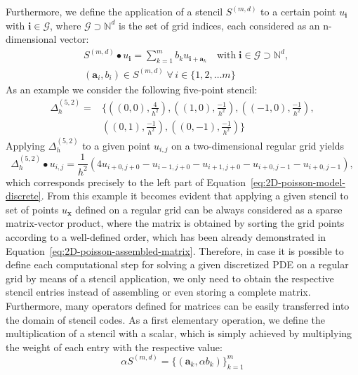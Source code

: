 Furthermore, we define the application of a stencil $S^{(m, d)}$ to a certain point $u_{\bm i}$ with $\bm i \in \mathcal G$, where $\mathcal G \supset \mathbb{N}^d$ is the set of grid indices, each considered as an n-dimensional vector:
\begin{equation}
	\begin{split}
		& S^{(m, d)} \bullet u_{\bm i} = \sum_{k=1}^m b_k u_{\bm i + \bm{a}_k} \quad 
		\text{with} \; \bm{i} \in \mathcal G \supset \mathbb{N}^d, \\ & (\bm{a}_i, b_i) \in S^{(m,d)} \; \forall \, i \in \{ 1, 2, \dots m \} 
	\end{split}
\end{equation}
As an example we consider the following five-point stencil:
\begin{equation}
	\begin{split}
		\Delta_h^{(5,2)} = & \bigg\{ \left( \left( 0,0 \right), \frac{4}{h^2}\right), \left(\left(1,0\right), \frac{-1}{h^2}\right), \left(\left(-1,0\right), \frac{-1}{h^2}\right), \\ & \left(\left(0,1\right), \frac{-1}{h^2}\right), \left(\left(0,-1\right), \frac{-1}{h^2}\right) \bigg\}
	\end{split}
	\label{eq:five-point-stencil}
\end{equation}
Applying $\Delta_{h}^{(5,2)}$ to a given point $u_{i,j}$ on a two-dimensional regular grid yields 
\begin{equation}
	\Delta_h^{(5,2)} \bullet u_{i,j} = \frac{1}{h^2} \left(4 u_{i+0,j+0}  - u_{i-1,j+0} - u_{i+1,j+0} - u_{i+0,j-1} - u_{i+0,j-1}\right),
\end{equation}
which corresponds precisely to the left part of Equation~\eqref{eq:2D-poisson-model-discrete}.
From this example it becomes evident that applying a given stencil to set of points $u_{\bm x}$ defined on a regular grid can be always considered as a sparse matrix-vector product, where the matrix is obtained by sorting the grid points according to a well-defined order, which has been already demonstrated in Equation~\eqref{eq:2D-poisson-assembled-matrix}.
Therefore, in case it is possible to define each computational step for solving a given discretized PDE on a regular grid by means of a stencil application, we only need to obtain the respective stencil entries instead of assembling or even storing a complete matrix.
Furthermore, many operators defined for matrices can be easily transferred into the domain of stencil codes.
As a first elementary operation, we define the multiplication of a stencil with a scalar, which is simply achieved by multiplying the weight of each entry with the respective value:
\begin{equation}
	\alpha S^{(m, d)} = \{(\bm{a}_k, \alpha b_k) \}_{k=1}^m
\end{equation}


